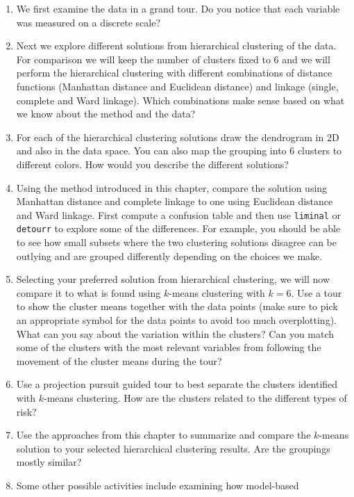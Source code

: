 \documentclass[
  letterpaper,
]{krantz}
\providecommand{\tightlist}{%
  \setlength{\itemsep}{0pt}\setlength{\parskip}{0pt}}
\begin{document}
\begin{enumerate}
\def\labelenumi{\arabic{enumi}.}
\tightlist
\item
  We first examine the data in a grand tour. Do you notice that each
  variable was measured on a discrete scale?
\item
  Next we explore different solutions from hierarchical clustering of
  the data. For comparison we will keep the number of clusters fixed to
  6 and we will perform the hierarchical clustering with different
  combinations of distance functions (Manhattan distance and Euclidean
  distance) and linkage (single, complete and Ward linkage). Which
  combinations make sense based on what we know about the method and the
  data?
\item
  For each of the hierarchical clustering solutions draw the dendrogram
  in 2D and also in the data space. You can also map the grouping into 6
  clusters to different colors. How would you describe the different
  solutions?
\item
  Using the method introduced in this chapter, compare the solution
  using Manhattan distance and complete linkage to one using Euclidean
  distance and Ward linkage. First compute a confusion table and then
  use \texttt{liminal} or \texttt{detourr} to explore some of the
  differences. For example, you should be able to see how small subsets
  where the two clustering solutions disagree can be outlying and are
  grouped differently depending on the choices we make.
\item
  Selecting your preferred solution from hierarchical clustering, we
  will now compare it to what is found using \(k\)-means clustering with
  \(k=6\). Use a tour to show the cluster means together with the data
  points (make sure to pick an appropriate symbol for the data points to
  avoid too much overplotting). What can you say about the variation
  within the clusters? Can you match some of the clusters with the most
  relevant variables from following the movement of the cluster means
  during the tour?
\item
  Use a projection pursuit guided tour to best separate the clusters
  identified with \(k\)-means clustering. How are the clusters related
  to the different types of risk?
\item
  Use the approaches from this chapter to summarize and compare the
  \(k\)-means solution to your selected hierarchical clustering results.
  Are the groupings mostly similar?
\item
  Some other possible activities include examining how model-based

\end{enumerate}
\end{document}
